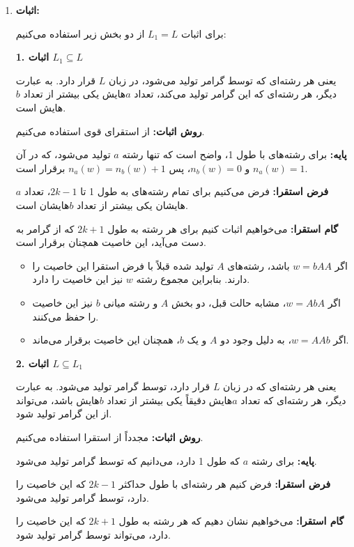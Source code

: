\begin{enumerate}
	\item 
	\textbf{اثبات:}
	
	برای اثبات $L_1 = L$ از دو بخش زیر استفاده می‌کنیم: 
	
	\textbf{1. اثبات $L_1 \subseteq L$} 
	
	یعنی هر رشته‌ای که توسط گرامر تولید می‌شود، در زبان $L$ قرار دارد. به عبارت دیگر، هر رشته‌ای که این گرامر تولید می‌کند، تعداد $a$هایش یکی بیشتر از تعداد $b$هایش است. 
	
	\textbf{روش اثبات:} از استقرای قوی استفاده می‌کنیم. 
	
	\textbf{پایه:} برای رشته‌های با طول 1، واضح است که تنها رشته $a$ تولید می‌شود، که در آن $n_a(w) = 1$ و $n_b(w) = 0$، پس $n_a(w) = n_b(w) + 1$ برقرار است. 
	
	\textbf{فرض استقرا:} فرض می‌کنیم برای تمام رشته‌های به طول 1 تا $2k-1$، تعداد $a$هایشان یکی بیشتر از تعداد $b$هایشان است. 
	
	\textbf{گام استقرا:} می‌خواهیم اثبات کنیم برای هر رشته به طول $2k+1$ که از گرامر به دست می‌آید، این خاصیت همچنان برقرار است. 
	
	\begin{itemize}
		\item اگر $w = bAA$ باشد، رشته‌های $A$ تولید شده قبلاً با فرض استقرا این خاصیت را دارند. بنابراین مجموع رشته $w$ نیز این خاصیت را دارد.
		\item اگر $w = AbA$، مشابه حالت قبل، دو بخش $A$ و رشته میانی $b$ نیز این خاصیت را حفظ می‌کنند.
		\item اگر $w = AAb$، به دلیل وجود دو $A$ و یک $b$، همچنان این خاصیت برقرار می‌ماند.
	\end{itemize}
	
	\noindent
	\textbf{2. اثبات $L \subseteq L_1$} 
	
	یعنی هر رشته‌ای که در زبان $L$ قرار دارد، توسط گرامر تولید می‌شود. به عبارت دیگر، هر رشته‌ای که تعداد $a$هایش دقیقاً یکی بیشتر از تعداد $b$هایش باشد، می‌تواند از این گرامر تولید شود. 
	
	\textbf{روش اثبات:} مجدداً از استقرا استفاده می‌کنیم. 
	
	\textbf{پایه:} برای رشته $a$ که طول 1 دارد، می‌دانیم که توسط گرامر تولید می‌شود. 
	
	\textbf{فرض استقرا:} فرض کنیم هر رشته‌ای با طول حداکثر $2k-1$ که این خاصیت را دارد، توسط گرامر تولید می‌شود. 
	
	\textbf{گام استقرا:} می‌خواهیم نشان دهیم که هر رشته به طول $2k+1$ که این خاصیت را دارد، می‌تواند توسط گرامر تولید شود. 
	

\end{enumerate}
